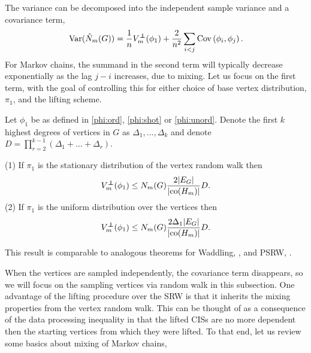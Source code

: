 The variance can be decomposed into the independent sample variance and a covariance term,
\begin{equation}
\label{eq:variance}
\Var(\hat N_m(G)) = \frac{1}{n}V_m^{\independent}(\phi_1) + \frac{2}{n^2} \sum_{i < j} \mathbb \Cov \left( \phi_i, \phi_j \right).
\end{equation}
For Markov chains, the summand in the second term will typically decrease exponentially as the lag $j-i$ increases, due to mixing.
Let us focus on the first term, with the goal of controlling this for either choice of base vertex distribution, $\pi_1$, and the lifting scheme.



\begin{theorem}
  \label{thm:var_bd}
  Let $\phi_1$ be as defined in \eqref{phi:ord}, \eqref{phi:shot} or \eqref{phi:unord}.
  Denote the first $k$ highest degrees of vertices in $G$ as $\Delta_1,\ldots, \Delta_k$ and denote $D = \prod_{r=2}^{k-1} (\Delta_1 +\ldots + \Delta_r)$.
  
  (1) If $\pi_1$ is the stationary distribution of the vertex random walk then
    \begin{equation}
    V_m^{\independent}(\phi_1) \leq N_m(G) \frac{2|E_G|}{|\co(H_m)|} D.
\end{equation}
  (2) If $\pi_1$ is the uniform distribution over the vertices then 
  \begin{equation}
      V_m^{\independent}(\phi_1) \leq N_m(G) \frac{2 \Delta_1 |E_G|}{|\co(H_m)|} D.
  \end{equation}
\end{theorem}
This result is comparable to analogous theorems for Waddling, \cite{Han2016waddling}, and PSRW, \cite{Wang2014psrw}.


When the vertices are sampled independently, the covariance term disappears, so we will focus on the sampling vertices via random walk in this subsection.
One advantage of the lifting procedure over the SRW is that it inherits the mixing properties from the vertex random walk.
This can be thought of as a consequence of the data processing inequality in that the lifted CISs are no more dependent then the starting vertices from which they were lifted.
To that end, let us review some basics about mixing of Markov chains,

